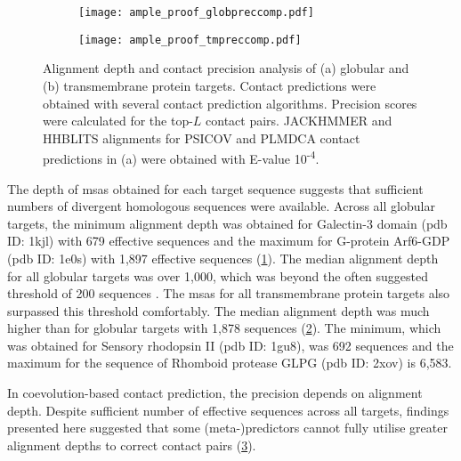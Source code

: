 \begin{figure}[H]
    \centering
    \begin{subfigure}[b]{\textwidth}
        \centering
        \texttt{[image: ample\_proof\_globpreccomp.pdf]}
        \caption{}
        \label{fig:ample_proof_globpreccomp}
    \end{subfigure}
    
    \begin{subfigure}[b]{\textwidth}
        \centering
        \texttt{[image: ample\_proof\_tmpreccomp.pdf]}
        \caption{}
        \label{fig:ample_proof_tmpreccomp}
    \end{subfigure}
    
    \caption[Alignment depth and contact precision analysis of all protein targets]{Alignment depth and contact precision analysis of (a) globular and (b) transmembrane protein targets. Contact predictions were obtained with several contact prediction algorithms. Precision scores were calculated for the top-$L$ contact pairs. JACKHMMER and HHBLITS alignments for PSICOV and PLMDCA contact predictions in (a) were obtained with E-value 10\textsuperscript{-4}.} 
    \label{fig:ample_proof_preccomp}
\end{figure}

The depth of \gls{msa}s obtained for each target sequence suggests that sufficient numbers of divergent homologous sequences were available. Across all globular targets, the minimum alignment depth was obtained for Galectin-3 domain (\gls{pdb} ID: 1kjl) with 679 effective sequences and the maximum for G-protein Arf6-GDP (\gls{pdb} ID: 1e0s) with 1,897 effective sequences (\cref{fig:ample_proof_globpreccomp}). The median alignment depth for all globular targets was over 1,000, which was beyond the often suggested threshold of 200 sequences \cite{Simkovic2017-xs}. The \gls{msa}s for all transmembrane protein targets also surpassed this threshold comfortably. The median alignment depth was much higher than for globular targets with 1,878 sequences (\cref{fig:ample_proof_tmpreccomp}). The minimum, which was obtained for Sensory rhodopsin II (\gls{pdb} ID: 1gu8), was 692 sequences and the maximum for the sequence of Rhomboid protease GLPG (\gls{pdb} ID: 2xov) is 6,583.

In coevolution-based contact prediction, the precision depends on alignment depth. Despite sufficient number of effective sequences across all targets, findings presented here suggested that some (meta-)predictors cannot fully utilise greater alignment depths to correct contact pairs (\cref{fig:ample_proof_preccomp}). 

